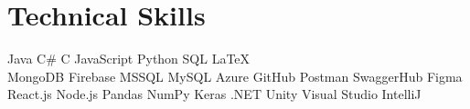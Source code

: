 \documentclass[]{deedy-resume-openfont}
\begin{document}

\section{Technical Skills}

Java \textbullet{}   C\# \textbullet{} C \textbullet{} JavaScript \textbullet{}
Python \textbullet{} SQL \textbullet{} LaTeX \\ 

MongoDB \textbullet{} Firebase \textbullet{} MSSQL \textbullet{} MySQL \textbullet{} Azure \textbullet{} GitHub  
 \textbullet{} Postman \textbullet{} SwaggerHub \textbullet{} Figma\\
React.js \textbullet{} Node.js \textbullet{} Pandas \textbullet{} NumPy \textbullet{}
Keras \textbullet{} .NET \textbullet{} Unity \textbullet{} Visual Studio \textbullet{} IntelliJ
\sectionsep

\hfill
\end{document}
